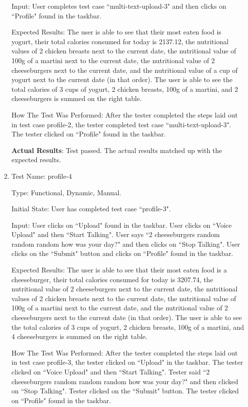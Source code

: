 \documentclass[12pt, titlepage]{article}
\begin{document}
\begin{enumerate}
		Input: User completes test case ``multi-text-upload-3" and then clicks on ``Profile" found in the taskbar.
		
		Expected Results: The user is able to see that their most eaten food is yogurt, their total calories consumed for today is 2137.12, the nutritional values of 2 chicken breasts next to the current date, the nutritional value of 100g of a martini next to the current date, the nutritional value of 2 cheeseburgers next to the current date, and the nutritional value of a cup of yogurt next to the current date (in that order). The user is able to see the total calories of 3 cups of yogurt, 2 chicken breasts, 100g of a martini, and 2 cheeseburgers is summed on the right table.
		
		How The Test Was Performed: After the tester completed the steps laid out in test case profile-2, the tester completed test case ``multi-text-upload-3". The tester clicked on ``Profile" found in the taskbar.
		
		\textbf{Actual Results}: Test passed. The actual results matched up with the expected results.
		
		\item{Test Name: profile-4}
		
		Type: Functional, Dynamic, Manual.
		
		Initial State: User has completed test case ``profile-3".
		
		Input: User clicks on ``Upload" found in the taskbar. User clicks on ``Voice Upload" and then ``Start Talking". User says ``2 cheeseburgers random random random how was your day?" and then clicks on ``Stop Talking". User clicks on the ``Submit" button and clicks on ``Profile" found in the taskbar.
		
		Expected Results: The user is able to see that their most eaten food is a cheeseburger, their total calories consumed for today is 3207.74, the nutritional value of 2 cheeseburgers next to the current date, the nutritional values of 2 chicken breasts next to the current date, the nutritional value of 100g of a martini next to the current date, and the nutritional value of 2 cheeseburgers next to the current date (in that order). The user is able to see the total calories of 3 cups of yogurt, 2 chicken breasts, 100g of a martini, and 4 cheeseburgers is summed on the right table.
		
		How The Test Was Performed: After the tester completed the steps laid out in test case profile-3, the tester clicked on ``Upload" in the taskbar. The tester clicked on ``Voice Upload" and then ``Start Talking". Tester said ``2 cheeseburgers random random random how was your day?" and then clicked on ``Stop Talking". Tester clicked on the ``Submit" button. The tester clicked on ``Profile" found in the taskbar.
		

\end{enumerate}
\end{document}
